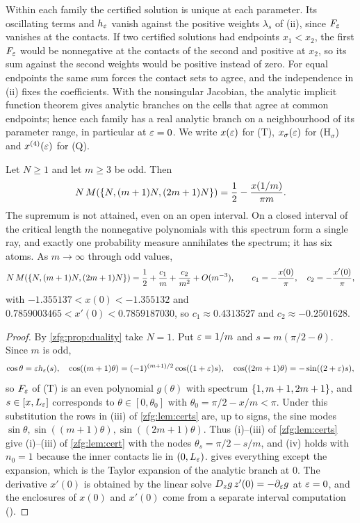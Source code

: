 Within each family the certified solution is unique at each parameter. Its oscillating terms and $h_\varepsilon$ vanish
against the positive weights $\lambda_s$ of (ii), since $F_\varepsilon$ vanishes at the contacts. If two certified solutions had
endpoints $x_1<x_2$, the first $F_\varepsilon$ would be nonnegative at the contacts of the second and positive at $x_2$, so its
sum against the second weights would be positive instead of zero. For equal endpoints the same sum forces the
contact sets to agree, and the independence in (ii) fixes the coefficients. With the nonsingular Jacobian, the
analytic implicit function theorem gives analytic branches on the cells that agree at common endpoints; hence each
family has a real analytic branch on a neighbourhood of its parameter range, in particular at $\varepsilon=0$. We write
$x(\varepsilon)$ for (T), $x_\sigma(\varepsilon)$ for (H$_\sigma$) and $x^{(4)}(\varepsilon)$ for (Q).

\begin{theorem}\label{zfg:thm:three}
Let $N\ge1$ and let $m\ge3$ be odd. Then
\[
 N\,M(\{N,(m+1)N,(2m+1)N\})=\frac12-\frac{x(1/m)}{\pi m}.
\]
The supremum is not attained, even on an open interval. On a closed interval of the critical length the
nonnegative polynomials with this spectrum form a single ray, and exactly one probability measure annihilates
the spectrum; it has six atoms. As $m\to\infty$ through odd values,
\[
 N\,M(\{N,(m+1)N,(2m+1)N\})=\frac12+\frac{c_1}m+\frac{c_2}{m^2}+O(m^{-3}),\qquad c_1=-\frac{x(0)}\pi,\quad c_2=-\frac{x'(0)}\pi,
\]
with $-1.355137<x(0)<-1.355132$ and $0.7859003465<x'(0)<0.7859187030$, so $c_1\approx0.4313527$ and $c_2\approx-0.2501628$.
\end{theorem}

\begin{proof}
By \cref{zfg:prop:duality} take $N=1$. Put $\varepsilon=1/m$ and $s=m(\pi/2-\theta)$. Since $m$ is odd,
\[
 \cos\theta=\varepsilon h_\varepsilon(s),\quad \cos((m+1)\theta)=(-1)^{(m+1)/2}\cos((1+\varepsilon)s),\quad \cos((2m+1)\theta)=-\sin((2+\varepsilon)s),
\]
so $F_\varepsilon$ of (T) is an even polynomial $g(\theta)$ with spectrum $\{1,m+1,2m+1\}$, and $s\in[x,L_\varepsilon]$ corresponds to
$\theta\in[0,\theta_0]$ with $\theta_0=\pi/2-x/m<\pi$. Under this substitution the rows in (iii) of \cref{zfg:lem:certs} are, up to
signs, the sine modes $\sin\theta,\sin((m+1)\theta),\sin((2m+1)\theta)$. Thus (i)--(iii) of \cref{zfg:lem:certs} give (i)--(iii) of
\cref{zfg:lem:cert} with the nodes $\theta_s=\pi/2-s/m$, and (iv) holds with $n_0=1$ because the inner contacts lie in
$(0,L_\varepsilon)$.  gives everything except the expansion, which is the Taylor expansion of the analytic
branch at $0$. The derivative $x'(0)$ is obtained by the linear solve $D_zg\,z'(0)=-\partial_\varepsilon g$ at $\varepsilon=0$, and the
enclosures of $x(0)$ and $x'(0)$ come from a separate interval computation
().
\end{proof}

